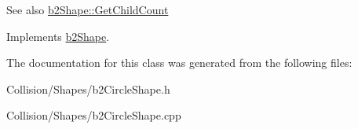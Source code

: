 \begin{DoxySeeAlso}{See also}
\mbox{\hyperlink{classb2Shape_a05a3c445017d96df9238ceefe6ce37ab}{b2\+Shape\+::\+Get\+Child\+Count}} 
\end{DoxySeeAlso}


Implements \mbox{\hyperlink{classb2Shape_a05a3c445017d96df9238ceefe6ce37ab}{b2\+Shape}}.



The documentation for this class was generated from the following files\+:\begin{DoxyCompactItemize}
\item 
Collision/\+Shapes/b2\+Circle\+Shape.\+h\item 
Collision/\+Shapes/b2\+Circle\+Shape.\+cpp\end{DoxyCompactItemize}
